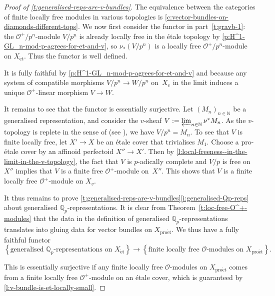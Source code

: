 \documentclass[10pt,a4paper]{article}
\theoremstyle{definition}
\theoremstyle{remark}
\newcommand{\lra}{\longrightarrow}
\newcommand{\N}{\mathbb{N}}
\renewcommand{\O}{\mathcal{O}}
\newcommand{\Q}{\mathbb{Q}}
\newcommand{\et}{{\operatorname{\acute{e}t}}}
\newcommand{\proet}{{\operatorname{pro\acute{e}t}}}
\numberwithin{equation}{section}
\begin{document}
\begin{proof}[Proof of \cref{t:generalised-reps-are-v-bundles}]
	The equivalence between the categories of finite locally free modules in various topologies is \cref{c:vector-bundles-on-diamonds-different-tops}.
	We now first consider the functor in part~\eqref{t:gravb-1}:
	 the $\O^+/p^n$-module $V/p^n$ is already locally free in the \'etale topology by \cref{p:H^1-GL_n-mod-p-agrees-for-et-and-v}, so  $\nu_{\ast}(V/p^n)$ is a locally free $\O^+/p^n$-module on $X_{\et}$. Thus the functor is well defined.
	
	It is fully faithful by \cref{p:H^1-GL_n-mod-p-agrees-for-et-and-v} and because any system of compatible morphisms $V/p^n\to W/p^n$ on~$X_v$ in the limit induces a unique $\O^+$-linear morphism $V\to W$. 
	
	It remains to see that the functor is essentially surjective. Let $(M_n)_{n\in\N}$ be a generalised representation, and consider the $v$-sheaf $V:=\varprojlim_{n\in\N} \nu^{\ast}M_n$. As the $v$-topology is replete in the sense of \cite[Section~3.1]{bhatt-scholze-proetale} (see \cite[Lemma~2.6]{heuer-Picard-good-reduction}), we have $V/p^n=M_n$. To see that $V$ is finite locally free, let $X'\to X$ be an \'etale cover that trivialises $M_1$. Choose a pro-\'etale cover by an affinoid perfectoid $X''\to X'$. Then by \cref{l:local-freeness--in-the-limit-in-the-v-topology}, the fact that $V$ is $p$-adically complete and $V/p$ is free on $X''$ implies that $V$ is a finite free $\O^+$-module on~$X''$. This shows that $V$ is a finite locally free $\O^+$-module on $X_v$.
		
	\medskip
	
	It thus remains to prove \cref{t:generalised-reps-are-v-bundles}\eqref{i:generalised-Qp-reps} about generalised $\Q_p$-representations.
	It is clear from Theorem~\ref{t:loc-free-O^+-modules} that the data in the definition of generalised $\Q_p$-representations translates into gluing data for vector bundles on $X_{\proet}$. We thus have a fully faithful functor 
	\[\left\{ \text{generalised $\Q_p$-representations on $X_{\et}$}\right\}\lra \left\{ \text{finite locally free $\O$-modules on $X_{\proet}$}\right\}.\]
	
	This is essentially surjective if any finite locally free $\O$-modules on $X_{\proet}$ comes from a finite locally free $\O^+$-module on an \'etale cover, which is guaranteed by \cref{l:v-bundle-is-et-locally-small}.
\end{proof}
\end{document}
